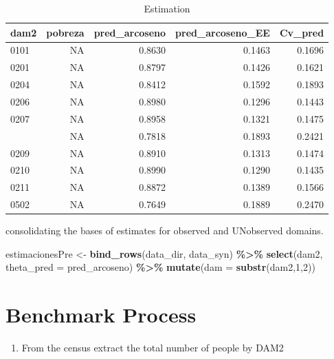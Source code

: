 \documentclass[
  12pt,
]{book}
\newenvironment{Shaded}{\begin{snugshade}}{\end{snugshade}}
\newcommand{\AttributeTok}[1]{\textcolor[rgb]{0.13,0.29,0.53}{#1}}
\newcommand{\DecValTok}[1]{\textcolor[rgb]{0.00,0.00,0.81}{#1}}
\newcommand{\FunctionTok}[1]{\textcolor[rgb]{0.13,0.29,0.53}{\textbf{#1}}}
\newcommand{\NormalTok}[1]{#1}
\newcommand{\OtherTok}[1]{\textcolor[rgb]{0.56,0.35,0.01}{#1}}
\newcommand{\SpecialCharTok}[1]{\textcolor[rgb]{0.81,0.36,0.00}{\textbf{#1}}}
\providecommand{\tightlist}{%
  \setlength{\itemsep}{0pt}\setlength{\parskip}{0pt}}
\begin{document}
\begin{table}[H]

\caption{\label{tab:unnamed-chunk-15}Estimation}
\centering
\begin{tabular}[t]{lrrrr}
\toprule
dam2 & pobreza & pred\_arcoseno & pred\_arcoseno\_EE & Cv\_pred\\
\midrule
0101 & NA & 0.8630 & 0.1463 & 0.1696\\
0201 & NA & 0.8797 & 0.1426 & 0.1621\\
0204 & NA & 0.8412 & 0.1592 & 0.1893\\
0206 & NA & 0.8980 & 0.1296 & 0.1443\\
0207 & NA & 0.8958 & 0.1321 & 0.1475\\
\addlinespace
0208 & NA & 0.7818 & 0.1893 & 0.2421\\
0209 & NA & 0.8910 & 0.1313 & 0.1474\\
0210 & NA & 0.8990 & 0.1290 & 0.1435\\
0211 & NA & 0.8872 & 0.1389 & 0.1566\\
0502 & NA & 0.7649 & 0.1889 & 0.2470\\
\bottomrule
\end{tabular}
\end{table}

consolidating the bases of estimates for observed and UNobserved domains.

\begin{Shaded}
\begin{Highlighting}[]
\NormalTok{estimacionesPre }\OtherTok{\textless{}{-}} \FunctionTok{bind\_rows}\NormalTok{(data\_dir, data\_syn) }\SpecialCharTok{\%\textgreater{}\%} 
  \FunctionTok{select}\NormalTok{(dam2, }\AttributeTok{theta\_pred =}\NormalTok{ pred\_arcoseno) }\SpecialCharTok{\%\textgreater{}\%} 
  \FunctionTok{mutate}\NormalTok{(}\AttributeTok{dam =} \FunctionTok{substr}\NormalTok{(dam2,}\DecValTok{1}\NormalTok{,}\DecValTok{2}\NormalTok{))}
\end{Highlighting}
\end{Shaded}

\hypertarget{benchmark-process}{%
\section{Benchmark Process}\label{benchmark-process}}

\begin{enumerate}
\def\labelenumi{\arabic{enumi}.}
\tightlist
\item
  From the census extract the total number of people by DAM2
\end{enumerate}
\end{document}
